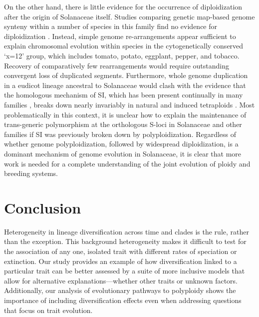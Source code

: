 On the other hand, there is little evidence for the occurrence of diploidization after the origin of Solanaceae itself.
Studies comparing genetic map-based genome synteny within a number of species in this family find no evidence for diploidization \citep{wu_2010a}.
Instead, simple genome re-arrangements appear sufficient to explain chromosomal evolution within species in the cytogenetically conserved `x=12' group, which includes tomato, potato, eggplant, pepper, and tobacco.
Recovery of comparatively few rearrangements would require outstanding convergent loss of duplicated segments.
Furthermore, whole genome duplication in a eudicot lineage ancestral to Solanaceae would clash with the evidence that the homologous mechanism of SI, which has been present continually in many families \citep{igic_2006}, breaks down nearly invariably in natural and induced tetraploids \citep{stone_2002, mcclure_2009}.
Most problematically in this context, it is unclear how to explain the maintenance of trans-generic polymorphism at the orthologous S-loci in Solanaceae and other families if SI was previously broken down by polyploidization.
%
Regardless of whether genome polyploidization, followed by widespread diploidization, is a dominant mechanism of genome evolution in Solanaceae, it is clear that more work is needed for a complete understanding of the joint evolution of ploidy and breeding systems.

\section{Conclusion}

Heterogeneity in lineage diversification across time and clades is the rule, rather than the exception.
This background heterogeneity makes it difficult to test for the association of any one, isolated trait with different rates of speciation or extinction.
Our study provides an example of how diversification linked to a particular trait can be better assessed by a suite of more inclusive models that allow for alternative explanations---whether other traits or unknown factors.
Additionally, our analysis of evolutionary pathways to polyploidy shows the importance of including diversification effects even when addressing questions that focus on trait evolution.
